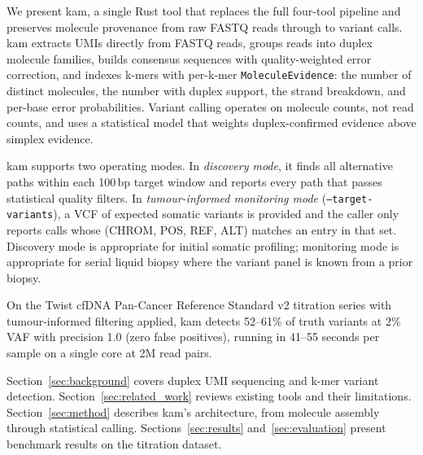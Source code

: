 We present kam, a single Rust tool that replaces the full four-tool pipeline and preserves molecule provenance from raw FASTQ reads through to variant calls.
kam extracts UMIs directly from FASTQ reads, groups reads into duplex molecule families, builds consensus sequences with quality-weighted error correction, and indexes k-mers with per-k-mer \texttt{MoleculeEvidence}: the number of distinct molecules, the number with duplex support, the strand breakdown, and per-base error probabilities.
Variant calling operates on molecule counts, not read counts, and uses a statistical model that weights duplex-confirmed evidence above simplex evidence.

kam supports two operating modes.
In \emph{discovery mode}, it finds all alternative paths within each 100\,bp target window and reports every path that passes statistical quality filters.
In \emph{tumour-informed monitoring mode} (\texttt{--target-variants}), a VCF of expected somatic variants is provided and the caller only reports calls whose (CHROM, POS, REF, ALT) matches an entry in that set.
Discovery mode is appropriate for initial somatic profiling; monitoring mode is appropriate for serial liquid biopsy where the variant panel is known from a prior biopsy.

On the Twist cfDNA Pan-Cancer Reference Standard v2 titration series with tumour-informed filtering applied, kam detects 52--61\% of truth variants at 2\% VAF with precision 1.0 (zero false positives), running in 41--55 seconds per sample on a single core at 2M read pairs.

Section~\ref{sec:background} covers duplex UMI sequencing and k-mer variant detection.
Section~\ref{sec:related_work} reviews existing tools and their limitations.
Section~\ref{sec:method} describes kam's architecture, from molecule assembly through statistical calling.
Sections~\ref{sec:results} and~\ref{sec:evaluation} present benchmark results on the titration dataset.
